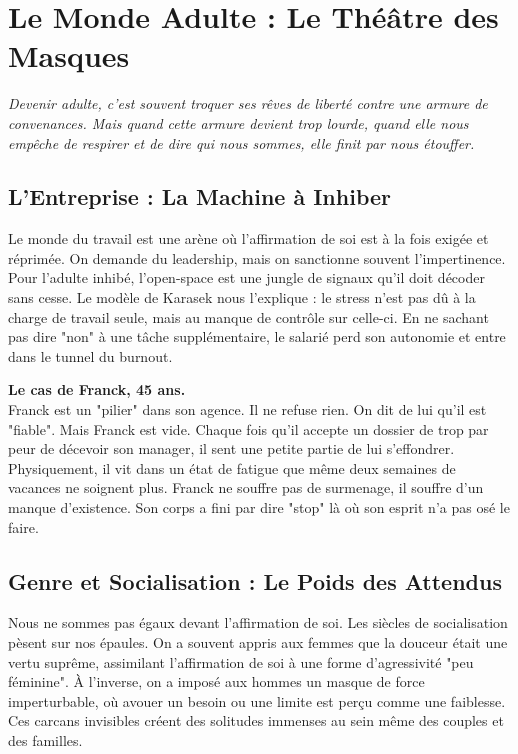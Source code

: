 \chapter{Le Monde Adulte : Le Théâtre des Masques}

\textit{Devenir adulte, c'est souvent troquer ses rêves de liberté contre une armure de convenances. Mais quand cette armure devient trop lourde, quand elle nous empêche de respirer et de dire qui nous sommes, elle finit par nous étouffer.}

\section{L'Entreprise : La Machine à Inhiber}
Le monde du travail est une arène où l'affirmation de soi est à la fois exigée et réprimée. On demande du leadership, mais on sanctionne souvent l'impertinence. Pour l'adulte inhibé, l'open-space est une jungle de signaux qu'il doit décoder sans cesse. Le modèle de Karasek nous l'explique : le stress n'est pas dû à la charge de travail seule, mais au manque de contrôle sur celle-ci. En ne sachant pas dire "non" à une tâche supplémentaire, le salarié perd son autonomie et entre dans le tunnel du burnout.

\begin{NoteClinique}
\textbf{Le cas de Franck, 45 ans.} \\
Franck est un "pilier" dans son agence. Il ne refuse rien. On dit de lui qu'il est "fiable". Mais Franck est vide. Chaque fois qu'il accepte un dossier de trop par peur de décevoir son manager, il sent une petite partie de lui s'effondrer. Physiquement, il vit dans un état de fatigue que même deux semaines de vacances ne soignent plus. Franck ne souffre pas de surmenage, il souffre d'un manque d'existence. Son corps a fini par dire "stop" là où son esprit n'a pas osé le faire.
\end{NoteClinique}

\section{Genre et Socialisation : Le Poids des Attendus}
Nous ne sommes pas égaux devant l'affirmation de soi. Les siècles de socialisation pèsent sur nos épaules. On a souvent appris aux femmes que la douceur était une vertu suprême, assimilant l'affirmation de soi à une forme d'agressivité "peu féminine". À l'inverse, on a imposé aux hommes un masque de force imperturbable, où avouer un besoin ou une limite est perçu comme une faiblesse. Ces carcans invisibles créent des solitudes immenses au sein même des couples et des familles.

